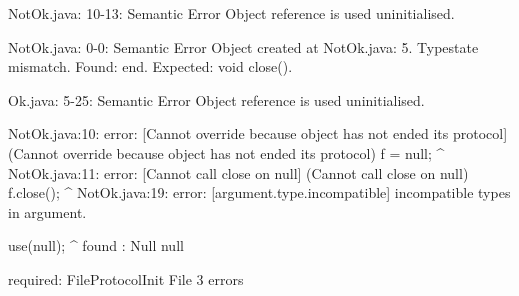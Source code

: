 \lstset{language=,caption=Original Mungo output}
\begin{code}

NotOk.java: 10-13: Semantic Error
		Object reference is used uninitialised.

NotOk.java: 0-0: Semantic Error
		Object created at NotOk.java: 5. Typestate mismatch. Found: end. Expected: void close().

Ok.java: 5-25: Semantic Error
		Object reference is used uninitialised.
\end{code}

\lstset{language=,caption=New Mungo output}
\begin{code}
NotOk.java:10: error: [Cannot override because object has not ended its protocol] (Cannot override because object has not ended its protocol)
        f = null;
        ^
NotOk.java:11: error: [Cannot call close on null] (Cannot call close on null)
        f.close();
               ^
NotOk.java:19: error: [argument.type.incompatible] incompatible types in argument.

    use(null);
        ^
  found   : Null null

  required: FileProtocol{Init} File
3 errors
\end{code}

